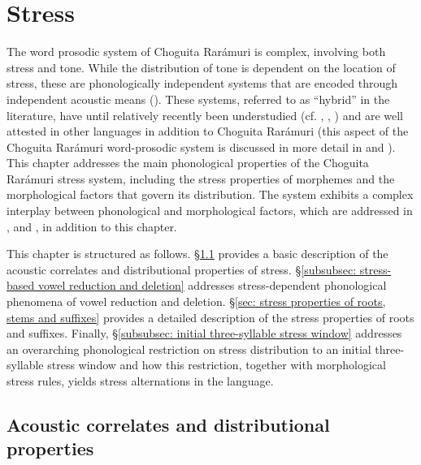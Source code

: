 \chapter{Stress}
\label{chap: word prosody}

The word prosodic system of Choguita Rarámuri is complex, involving both stress and tone. While the distribution of tone is dependent on the location of stress, these are phonologically independent systems that are encoded through independent acoustic means (\citealt{caballero2015tone}). These systems, referred to as ``hybrid'' in the literature, have until relatively recently been understudied (cf. \citealt{remijsen2001dialectal}, \citealt{remijsen2002lexically}, \citealt{remijsen2005stress}) and are well attested in other  languages in addition to Choguita Rarámuri (this aspect of the Choguita Rarámuri word-prosodic system is discussed in more detail in  and ). This chapter addresses the main phonological properties of the Choguita Rarámuri stress system, including the stress properties of morphemes and the morphological factors that govern its distribution. The system exhibits a complex interplay between phonological and morphological factors, which are addressed in ,  and , in addition to this chapter.

This chapter is structured as follows. §\ref{subsec: stress and stress-dependent phenomena} provides a basic description of the acoustic correlates and distributional properties of stress. §\ref{subsubsec: stress-based vowel reduction and deletion} addresses stress-dependent phonological phenomena of vowel reduction and deletion. §\ref{sec: stress properties of roots, stems and suffixes} provides a detailed description of the stress properties of roots and suffixes. Finally, §\ref{subsubsec: initial three-syllable stress window} addresses an overarching phonological restriction on stress distribution to an initial three-syllable stress window and how this restriction, together with morphological stress rules, yields stress alternations in the language.

\section{Acoustic correlates and distributional properties}
\label{subsec: stress and stress-dependent phenomena}


